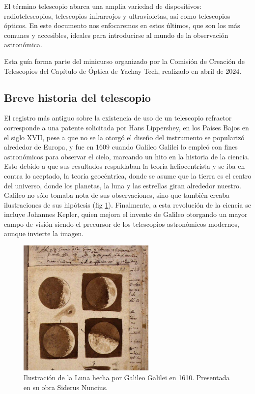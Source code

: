 El término telescopio abarca una amplia variedad de dispositivos: radiotelescopios, telescopios infrarrojos y ultravioletas, así como telescopios ópticos. En este documento nos enfocaremos en estos últimos, que son los más comunes y accesibles, ideales para introducirse al mundo de la observación astronómica.

Esta guía forma parte del minicurso organizado por la Comisión de Creación de Telescopios del Capítulo de Óptica de Yachay Tech, realizado en abril de 2024.

\subsection*{Breve historia del telescopio}

El registro más antiguo sobre la existencia de uso de un telescopio refractor corresponde a una patente solicitada por Hans Lippershey, en los Países Bajos en el siglo XVII, pese a que no se la otorgó el diseño del instrumento se popularizó alrededor de Europa, y fue en 1609 cuando Galileo Galilei lo empleó con fines astronómicos para observar el cielo, marcando un hito en la historia de la ciencia. Esto debido a que sus resultados respaldaban la teoría heliocentrista y se iba en contra lo aceptado, la teoría geocéntrica, donde se asume que la tierra es el centro del universo, donde los planetas, la luna y las estrellas giran alrededor nuestro. Galileo no sólo tomaba nota de sus observaciones, sino que también creaba ilustraciones de sus hipótesis (fig \ref{fig:ilustracion_luna_galileo_1610}). Finalmente, a esta revolución de la ciencia se incluye Johannes Kepler, quien mejora el invento de Galileo otorgando un mayor campo de visión siendo el precursor de los telescopios astronómicos modernos, aunque invierte la imagen. 

\begin{figure}[H]
	\centering
	\includegraphics[width=0.6\textwidth]{images/ilustracion_galileo.jpg}
	\caption{Ilustración de la Luna hecha por Galileo Galilei en 1610. Presentada en su obra Siderus Nuncius.}
	\label{fig:ilustracion_luna_galileo_1610}
\end{figure}

